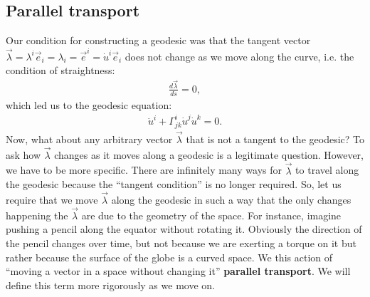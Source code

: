 \documentclass{article}
\theoremstyle{definition}
\begin{document}
\subsection{Parallel transport}
Our condition for constructing a geodesic was that the tangent vector $\vec{\lambda} = \lambda^i\vec{e}_i = \lambda_i = \vec{e}^i = \dot{u}^i\vec{e}_i$ does not change as we move along the curve, i.e. the condition of straightness:
\begin{align*}
\frac{d\vec{\lambda}}{ds} = 0,
\end{align*} 
which led us to the geodesic equation:
\begin{align*}
\ddot{u}^i + \Gamma^i_{jk}\dot{u}^j\dot{u}^k = 0.
\end{align*}
Now, what about any arbitrary vector $\vec{\lambda}$ that is not a tangent to the geodesic? To ask how $\vec{\lambda}$ changes as it moves along a geodesic is a legitimate question. However, we have to be more specific. There are infinitely many ways for $\vec{\lambda}$ to travel along the geodesic because the ``tangent condition'' is no longer required. So, let us require that we move $\vec{\lambda}$ along the geodesic in such a way that the only changes happening the $\vec{\lambda}$ are due to the geometry of the space. For instance, imagine pushing a pencil along the equator without rotating it. Obviously the direction of the pencil changes over time, but not because we are exerting a torque on it but rather because the surface of the globe is a curved space. We this action of ``moving a vector in a space without changing it'' \textbf{parallel transport}. We will define this term more rigorously as we move on. \\
\end{document}
